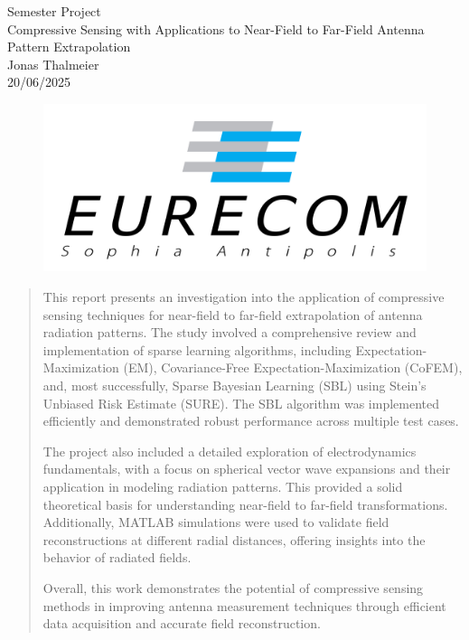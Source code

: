 \documentclass{article}
\begin{document}
\begin{titlepage}
\begin{center}
    \vspace{15cm}
    \huge{Semester Project}\\
    \vspace{2cm}
    \Huge{Compressive Sensing with Applications to Near-Field to Far-Field Antenna Pattern
Extrapolation}\\
    \vspace{2cm}
    \Large{Jonas Thalmeier}\\
    \vspace{1cm}
    20/06/2025
\end{center}
\vspace{3cm}
\begin{figure}[h]
    \centering
    \includegraphics[width=.5\textwidth]{Figures/Eurecom.png}
\end{figure}
\end{titlepage}

\newpage
\tableofcontents
\thispagestyle{empty}
\newpage
\setcounter{page}{1}

\begin{abstract}
This report presents an investigation into the application of compressive sensing techniques for near-field to far-field extrapolation of antenna radiation patterns. The study involved a comprehensive review and implementation of sparse learning algorithms, including Expectation-Maximization (EM), Covariance-Free Expectation-Maximization (CoFEM), and, most successfully, Sparse Bayesian Learning (SBL) using Stein’s Unbiased Risk Estimate (SURE). The SBL algorithm was implemented efficiently and demonstrated robust performance across multiple test cases. 

The project also included a detailed exploration of electrodynamics fundamentals, with a focus on spherical vector wave expansions and their application in modeling radiation patterns. This provided a solid theoretical basis for understanding near-field to far-field transformations. Additionally, MATLAB simulations were used to validate field reconstructions at different radial distances, offering insights into the behavior of radiated fields. 

Overall, this work demonstrates the potential of compressive sensing methods in improving antenna measurement techniques through efficient data acquisition and accurate field reconstruction.
\end{abstract}
\end{document}
